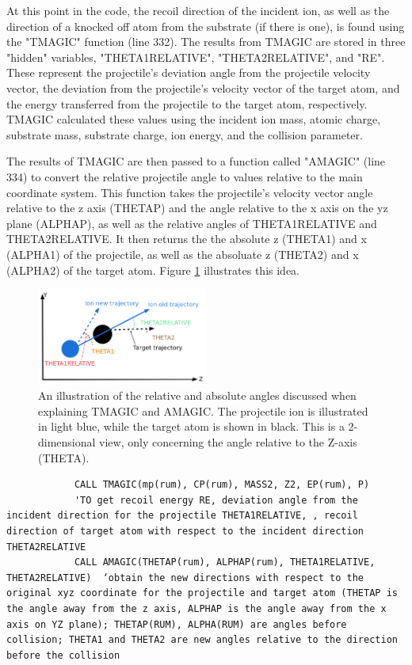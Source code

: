 \documentclass[10pt, reqno]{exam}
\begin{document}
At this point in the code, the recoil direction of the incident ion, as well as the direction of a knocked off atom from the substrate (if there is one), is found using the "TMAGIC" function (line 332). The results from TMAGIC are stored in three "hidden" variables, "THETA1RELATIVE", "THETA2RELATIVE", and "RE". These represent the projectile's deviation angle from the projectile velocity vector, the deviation from the projectile's velocity vector of the target atom, and the energy transferred from the projectile to the target atom, respectively. TMAGIC calculated these values using the incident ion mass, atomic charge, substrate mass, substrate charge, ion energy, and the collision parameter. \par

The results of TMAGIC are then passed to a function called "AMAGIC" (line 334) to convert the relative projectile angle to values relative to the main coordinate system. This function takes the projectile's velocity vector angle relative to the z axis (THETAP) and the angle relative to the x axis on the yz plane (ALPHAP), as well as the relative angles of THETA1RELATIVE and THETA2RELATIVE. It then returns the the absolute z (THETA1) and x (ALPHA1) of the projectile, as well as the absoluate z (THETA2) and x (ALPHA2) of the target atom. Figure \ref{fig:relative angles explanation} illustrates this idea.

\begin{figure}[h]
    \centering
    \includegraphics[width = 0.5\textwidth]{figures/relative_angles_explanation.png}
    \caption{An illustration of the relative and absolute angles discussed when explaining TMAGIC and AMAGIC. The projectile ion is illustrated in light blue, while the target atom is shown in black. This is a 2-dimensional view, only concerning the angle relative to the Z-axis (THETA).}
    \label{fig:relative angles explanation}
\end{figure}

\begin{verbatim}   
            CALL TMAGIC(mp(rum), CP(rum), MASS2, Z2, EP(rum), P)  
            'TO get recoil energy RE, deviation angle from the incident direction for the projectile THETA1RELATIVE, , recoil direction of target atom with respect to the incident direction THETA2RELATIVE
            CALL AMAGIC(THETAP(rum), ALPHAP(rum), THETA1RELATIVE, THETA2RELATIVE)  ‘obtain the new directions with respect to the original xyz coordinate for the projectile and target atom (THETAP is the angle away from the z axis, ALPHAP is the angle away from the x axis on YZ plane); THETAP(RUM), ALPHA(RUM) are angles before collision; THETA1 and THETA2 are new angles relative to the direction before the collision
\end{verbatim}
\end{document}
